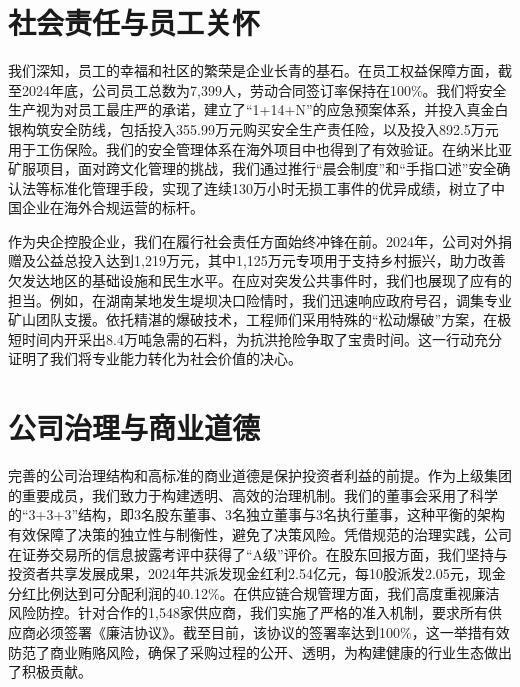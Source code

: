 \documentclass[a4paper,12pt]{article}
\begin{document}
\section{社会责任与员工关怀}

我们深知，员工的幸福和社区的繁荣是企业长青的基石。在员工权益保障方面，截至2024年底，公司员工总数为7,399人，劳动合同签订率保持在100\%。我们将安全生产视为对员工最庄严的承诺，建立了“1+14+N”的应急预案体系，并投入真金白银构筑安全防线，包括投入355.99万元购买安全生产责任险，以及投入892.5万元用于工伤保险。我们的安全管理体系在海外项目中也得到了有效验证。在纳米比亚矿服项目，面对跨文化管理的挑战，我们通过推行“晨会制度”和“手指口述”安全确认法等标准化管理手段，实现了连续130万小时无损工事件的优异成绩，树立了中国企业在海外合规运营的标杆。

作为央企控股企业，我们在履行社会责任方面始终冲锋在前。2024年，公司对外捐赠及公益总投入达到1,219万元，其中1,125万元专项用于支持乡村振兴，助力改善欠发达地区的基础设施和民生水平。在应对突发公共事件时，我们也展现了应有的担当。例如，在湖南某地发生堤坝决口险情时，我们迅速响应政府号召，调集专业矿山团队支援。依托精湛的爆破技术，工程师们采用特殊的“松动爆破”方案，在极短时间内开采出8.4万吨急需的石料，为抗洪抢险争取了宝贵时间。这一行动充分证明了我们将专业能力转化为社会价值的决心。

\section{公司治理与商业道德}

完善的公司治理结构和高标准的商业道德是保护投资者利益的前提。作为上级集团的重要成员，我们致力于构建透明、高效的治理机制。我们的董事会采用了科学的“3+3+3”结构，即3名股东董事、3名独立董事与3名执行董事，这种平衡的架构有效保障了决策的独立性与制衡性，避免了决策风险。凭借规范的治理实践，公司在证券交易所的信息披露考评中获得了“A级”评价。在股东回报方面，我们坚持与投资者共享发展成果，2024年共派发现金红利2.54亿元，每10股派发2.05元，现金分红比例达到可分配利润的40.12\%。在供应链合规管理方面，我们高度重视廉洁风险防控。针对合作的1,548家供应商，我们实施了严格的准入机制，要求所有供应商必须签署《廉洁协议》。截至目前，该协议的签署率达到100\%，这一举措有效防范了商业贿赂风险，确保了采购过程的公开、透明，为构建健康的行业生态做出了积极贡献。
\end{document}
